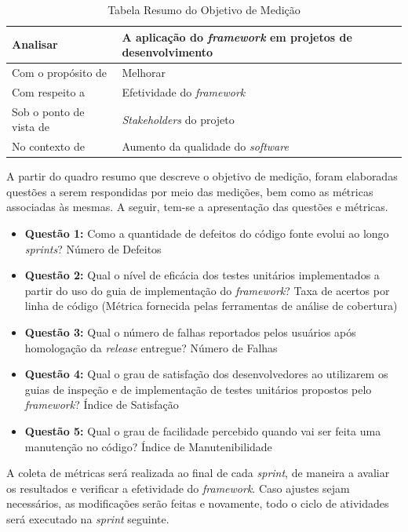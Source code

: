 \begin{table}[h]
\centering
\begin{tabular}{ | m{8cm} | m{8cm} | } 
\hline
Analisar & A aplicação do \textit{framework} em projetos de desenvolvimento \\ 
\hline
Com o propósito de & Melhorar \\ 
\hline
Com respeito a & Efetividade do \textit{framework} \\ 
\hline
Sob o ponto de vista de & \textit{Stakeholders} do projeto \\ 
\hline
No contexto de & Aumento da qualidade do \textit{software} \\ 
\hline
\end{tabular}
\caption{Tabela Resumo do Objetivo de Medição}\label{table:1}
\end{table}

A partir do quadro resumo que descreve o objetivo de medição, foram elaboradas questões a serem respondidas por meio das medições, bem como as métricas associadas às mesmas. A seguir, tem-se a apresentação das questões e métricas.

\begin{itemize}
	\item \textbf{Questão 1:} Como a quantidade de defeitos do código fonte evolui ao longo \textit{sprints}?
	\subitem Número de Defeitos

	\item \textbf{Questão 2:} Qual o nível de eficácia dos testes unitários implementados a partir do uso do guia de implementação do \textit{framework}?
	\subitem Taxa de acertos por linha de código (Métrica fornecida pelas ferramentas de análise de cobertura)

	\item \textbf{Questão 3:} Qual o número de falhas reportados pelos usuários após homologação da \textit{release} entregue?
	\subitem Número de Falhas

	\item \textbf{Questão 4:} Qual o grau de satisfação dos desenvolvedores ao utilizarem os guias de inspeção e de implementação de testes unitários propostos pelo \textit{framework}?
	\subitem Índice de Satisfação

	\item \textbf{Questão 5:} Qual o grau de facilidade percebido quando vai ser feita uma manutenção no código?
	\subitem Índice de Manutenibilidade
\end{itemize}

A coleta de métricas será realizada ao final de cada \textit{sprint}, de maneira a avaliar os resultados e verificar a efetividade do \textit{framework}. Caso ajustes sejam necessários, as modificações serão feitas e novamente, todo o ciclo de atividades será executado na \textit{sprint} seguinte.

